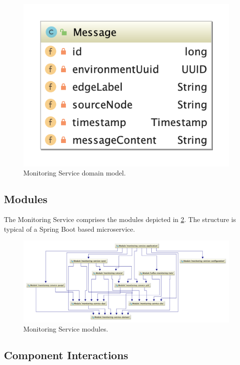  \begin{figure}[H]
	\centering  
	\includegraphics[scale=1.8] {figures/impl/monitor/domain_package.png}
	\caption{Monitoring Service domain model.}
	\label{monitoring_svc_domain_model}
\end{figure}

\subsection{Modules} \label{monitoring_service_modules}
The Monitoring Service comprises the modules depicted in  \ref{monitoring_svc_modules}. The structure is typical of a Spring Boot based microservice.

\begin{figure}[H]
	\centering  
	\includegraphics[width=\linewidth]{figures/impl/monitor/modules.png}
	\caption{Monitoring Service modules.}
	\label{monitoring_svc_modules}
\end{figure}

\subsection{Component Interactions} \label{monitoring_service_interactions}

